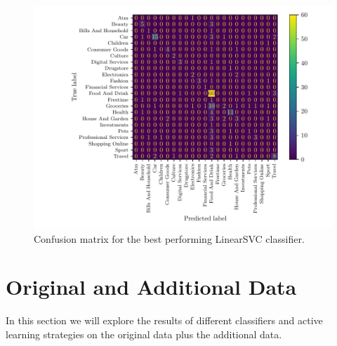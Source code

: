\begin{figure}[ht]
  \centering
  \includegraphics[width=\textwidth]{../img/plot_cm_LinearSVC.pdf}
  \caption{Confusion matrix for the best performing LinearSVC classifier.}
  \label{fig:confusion_matrix}
\end{figure}


\section{Original and Additional Data}

In this section we will explore the results of different classifiers and active learning strategies on the original data plus the additional data.
